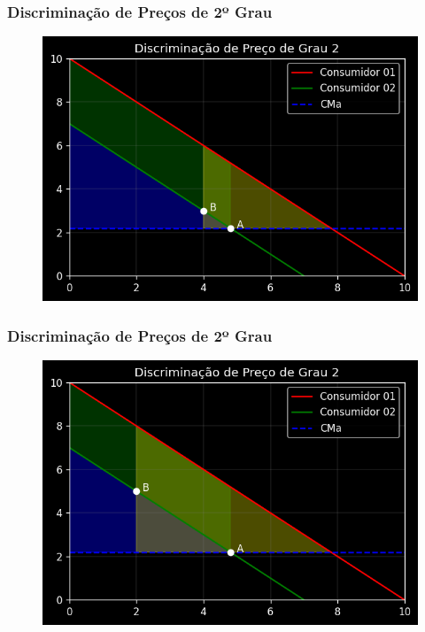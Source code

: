 \documentclass{beamer}[10]
\begin{document}
\begin{frame}
	\frametitle{Discriminação de Preços de 2º Grau}

	\begin{figure}[H]
		\centering
		\includegraphics[scale=0.7]{cap26_3-discriminacao_grau2_2.png}
	\end{figure}
	
\end{frame}

\begin{frame}
	\frametitle{Discriminação de Preços de 2º Grau}

	\begin{figure}[H]
		\centering
		\includegraphics[scale=0.7]{cap26_3-discriminacao_grau2_3.png}
	\end{figure}
	
\end{frame}
\end{document}
